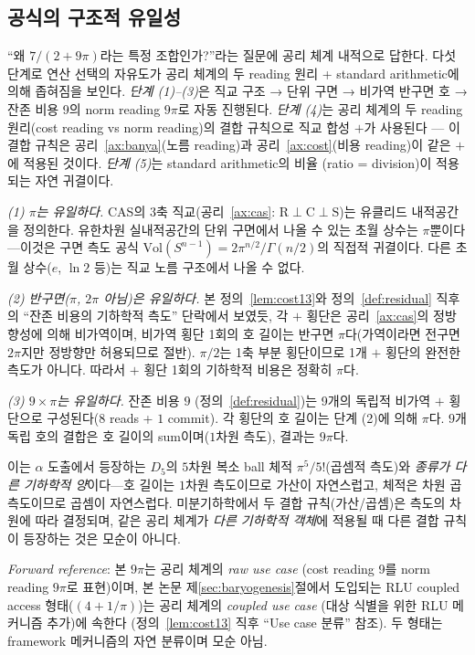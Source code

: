 \documentclass[entropy,article,submit,pdftex,oneauthor]{Definitions/mdpi}
\begin{document}
\subsection{공식의 구조적 유일성}

``왜 $7/(2+9\pi)$라는 특정 조합인가?''라는 질문에 공리 체계 내적으로 답한다. 다섯 단계로 연산 선택의 자유도가 공리 체계의 두 reading 원리 + standard arithmetic에 의해 좁혀짐을 보인다. \emph{단계 (1)--(3)}은 직교 구조 → 단위 구면 → 비가역 반구면 호 → 잔존 비용 9의 norm reading $9\pi$로 자동 진행된다. \emph{단계 (4)}는 공리 체계의 두 reading 원리(cost reading vs norm reading)의 결합 규칙으로 직교 합성 $+$가 사용된다 — 이 결합 규칙은 공리~\ref{ax:banya}(노름 reading)과 공리~\ref{ax:cost}(비용 reading)이 같은 $+$에 적용된 것이다. \emph{단계 (5)}는 standard arithmetic의 비율 (ratio = division)이 적용되는 자연 귀결이다.

\emph{(1) $\pi$는 유일하다.} CAS의 3축 직교(공리~\ref{ax:cas}: $\mathrm{R} \perp \mathrm{C} \perp \mathrm{S}$)는 유클리드 내적공간을 정의한다. 유한차원 실내적공간의 단위 구면에서 나올 수 있는 초월 상수는 $\pi$뿐이다---이것은 구면 측도 공식 $\mathrm{Vol}(S^{n-1}) = 2\pi^{n/2}/\Gamma(n/2)$의 직접적 귀결이다. 다른 초월 상수($e$, $\ln 2$ 등)는 직교 노름 구조에서 나올 수 없다.

\emph{(2) 반구면($\pi$, $2\pi$ 아님)은 유일하다.} 본 정의~\ref{lem:cost13}와 정의~\ref{def:residual} 직후의 ``잔존 비용의 기하학적 측도'' 단락에서 보였듯, 각 $+$ 횡단은 공리~\ref{ax:cas}의 정방향성에 의해 비가역이며, 비가역 횡단 1회의 호 길이는 반구면 $\pi$다(가역이라면 전구면 $2\pi$지만 정방향만 허용되므로 절반). $\pi/2$는 1축 부분 횡단이므로 1개 $+$ 횡단의 완전한 측도가 아니다. 따라서 $+$ 횡단 1회의 기하학적 비용은 정확히 $\pi$다.

\emph{(3) $9 \times \pi$는 유일하다.} 잔존 비용 $9$ (정의~\ref{def:residual})는 9개의 독립적 비가역 $+$ 횡단으로 구성된다($8$ reads + $1$ commit). 각 횡단의 호 길이는 단계 (2)에 의해 $\pi$다. $9$개 독립 호의 결합은 호 길이의 sum이며($1$차원 측도), 결과는 $9\pi$다.

이는 $\alpha$ 도출에서 등장하는 $D_5$의 $5$차원 복소 ball 체적 $\pi^5/5!$(곱셈적 측도)와 \emph{종류가 다른 기하학적 양}이다---호 길이는 $1$차원 측도이므로 가산이 자연스럽고, 체적은 차원 곱 측도이므로 곱셈이 자연스럽다. 미분기하학에서 두 결합 규칙(가산/곱셈)은 측도의 차원에 따라 결정되며, 같은 공리 체계가 \emph{다른 기하학적 객체}에 적용될 때 다른 결합 규칙이 등장하는 것은 모순이 아니다.

\emph{Forward reference}: 본 $9\pi$는 공리 체계의 \emph{raw use case} (cost reading 9를 norm reading $9\pi$로 표현)이며, 본 논문 제\ref{sec:baryogenesis}절에서 도입되는 RLU coupled access 형태($(4 + 1/\pi)$)는 공리 체계의 \emph{coupled use case} (대상 식별을 위한 RLU 메커니즘 추가)에 속한다 (정의~\ref{lem:cost13} 직후 ``Use case 분류'' 참조). 두 형태는 framework 메커니즘의 자연 분류이며 모순 아님.
\end{document}
